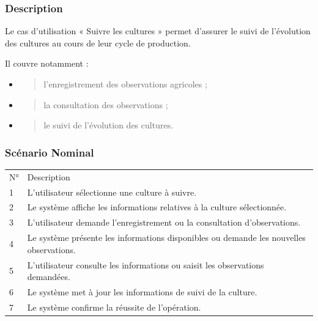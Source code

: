 \documentclass[
]{article}
\begin{document}
\hypertarget{description-1}{%
\subsubsection{Description}\label{description-1}}

Le cas d'utilisation « Suivre les cultures » permet d'assurer le suivi
de l'évolution des cultures au cours de leur cycle de production.

Il couvre notamment :

\begin{itemize}
\item
  \begin{quote}
  l'enregistrement des observations agricoles ;
  \end{quote}
\item
  \begin{quote}
  la consultation des observations ;
  \end{quote}
\item
  \begin{quote}
  le suivi de l'évolution des cultures.
  \end{quote}
\end{itemize}

\hypertarget{scuxe9nario-nominal-2}{%
\subsubsection{Scénario Nominal}\label{scuxe9nario-nominal-2}}

\begin{longtable}[]{@{}ll@{}}
\toprule
\endhead
N° & Description \\
1 & L'utilisateur sélectionne une culture à suivre. \\
2 & Le système affiche les informations relatives à la culture
sélectionnée. \\
3 & L'utilisateur demande l'enregistrement ou la consultation
d'observations. \\
4 & Le système présente les informations disponibles ou demande les
nouvelles observations. \\
5 & L'utilisateur consulte les informations ou saisit les observations
demandées. \\
6 & Le système met à jour les informations de suivi de la culture. \\
7 & Le système confirme la réussite de l'opération. \\
\bottomrule
\end{longtable}
\end{document}
